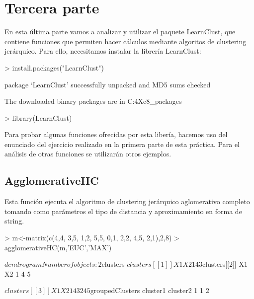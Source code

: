 \documentclass [a4paper] {article}
\begin{document}
\section{Tercera parte}

En esta última parte vamos a analizar y utilizar el paquete LearnClust, que contiene funciones que permiten hacer cálculos mediante algoritos de clustering jerárquico. Para ello, necesitamos instalar la librería LearnClust:

\begin{Schunk}
\begin{Sinput}
> install.packages("LearnClust")
\end{Sinput}
\begin{Soutput}
package ‘LearnClust’ successfully unpacked and MD5 sums checked

The downloaded binary packages are in
	C:\Users\Javier\AppData\Local\Temp\RtmpAZ4Xc8\downloaded_packages
\end{Soutput}
\begin{Sinput}
> library(LearnClust)
\end{Sinput}
\end{Schunk}

Para probar algunas funciones ofrecidas por esta libería, hacemos uso del enunciado del ejercicio realizado en la primera parte de esta práctica. Para el análisis de otras funciones se utilizarán otros ejemplos.

\subsection{AgglomerativeHC}

Esta función ejecuta el algoritmo de clustering jerárquico aglomerativo completo tomando como parámetros el tipo de distancia y aproximamiento en forma de string.

\begin{Schunk}
\begin{Sinput}
> m<-matrix(c(4,4, 3,5, 1,2, 5,5, 0,1, 2,2, 4,5, 2,1),2,8)
> agglomerativeHC(m,'EUC','MAX')
\end{Sinput}
\begin{Soutput}
$dendrogram
Number of objects: 2 


$clusters
$clusters[[1]]
  X1 X2
1  4  3

$clusters[[2]]
  X1 X2
1  4  5

$clusters[[3]]
  X1 X2
1  4  3
2  4  5


$groupedClusters
  cluster1 cluster2
1        1        2
\end{Soutput}
\end{Schunk}
\end{document}
